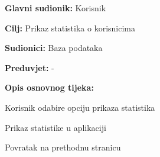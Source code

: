 			
		
	
			\noindent {}
			\begin{packed_item}
				
				\item \textbf{Glavni sudionik: }Korisnik
				\item  \textbf{Cilj:} Prikaz statistika o korisnicima 
				\item  \textbf{Sudionici:} Baza podataka
				\item  \textbf{Preduvjet:} -
				\item  \textbf{Opis osnovnog tijeka:}
				
				\item[] \begin{packed_enum}
					
					\item Korisnik odabire opciju prikaza statistika
					\item Prikaz statistike u aplikaciji
					\item Povratak na prethodnu stranicu
			
				\end{packed_enum}
				
				
				
			\end{packed_item}
		
